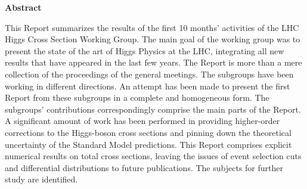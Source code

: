 \begin{center} 
 \bf {Abstract}
\end{center}
\vspace{0.5cm}
This Report summarizes the results of the first 10 months' activities of 
the LHC Higgs Cross Section Working Group.
The main goal of the working group was to present the state of the art of
Higgs Physics at the LHC, integrating all new results that have appeared in the
last few years.
The Report is more than a mere collection of the proceedings of
the general meetings. The subgroups have been working in different 
directions. An attempt has been made to present the first Report from these
subgroups in a complete and homogeneous form. The subgroups' contributions
correspondingly comprise the main parts of the Report.
A significant amount of work has been performed in providing higher-order
corrections to the Higgs-boson cross sections and pinning down the
theoretical uncertainty of the Standard Model predictions.
This Report comprises explicit numerical results on total cross sections,
leaving the issues of event selection cuts and differential distributions to future publications.
The subjects for further study are identified.

